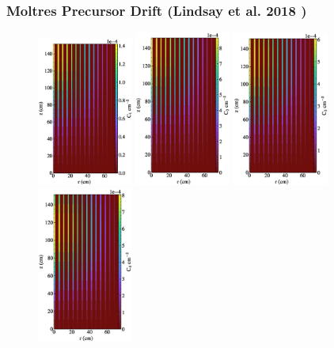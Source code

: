\begin{frame}
        \frametitle{Moltres Precursor Drift 
        (Lindsay et al. 2018 \cite{lindsay_introduction_2018})}
  \begin{figure}
   \vspace{-0.1in}
   \includegraphics[width=0.28\textwidth]{./images/auto_diff_rho_pre1.eps}
   \includegraphics[width=0.28\textwidth]{./images/auto_diff_rho_pre2.eps}
   \includegraphics[width=0.28\textwidth]{./images/auto_diff_rho_pre3.eps}
   \includegraphics[width=0.28\textwidth]{./images/auto_diff_rho_pre4.eps}

\end{figure}
\end{frame}

